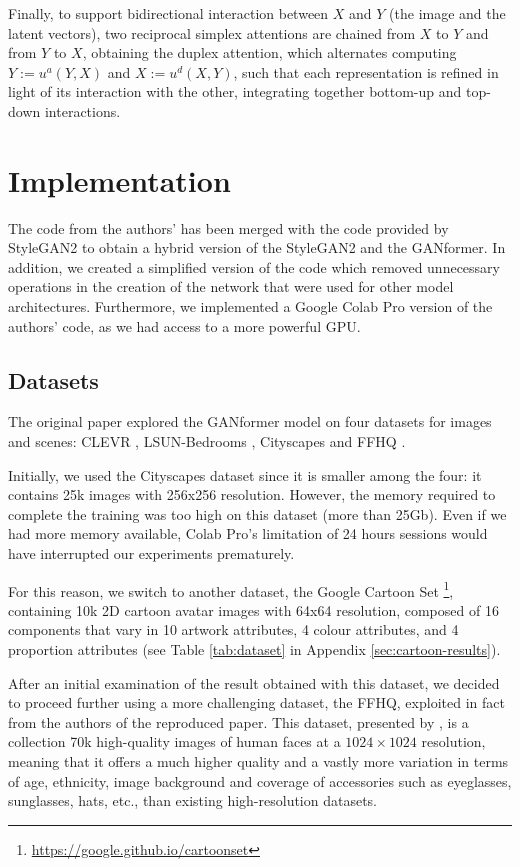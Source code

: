 \documentclass{article}
\begin{document}
Finally, to support bidirectional interaction between $X$ and $Y$ (the image and the latent vectors), 
two 
reciprocal simplex attentions are chained from $X$ to $Y$ and from $Y$ to $X$, obtaining the 
duplex 
attention, which alternates computing $Y :=u^a(Y,X)$ and $X:=u^d(X,Y)$, such that each 
representation is refined in light of its interaction with the other, integrating together bottom-up and 
top-down interactions.

\section{Implementation}
The code from the authors' has been merged with the code provided by StyleGAN2 to obtain a 
hybrid version of the StyleGAN2 and the GANformer. In addition, we created a simplified version of the code which removed unnecessary operations in the creation of the network that were used for other model architectures. Furthermore, we implemented a Google Colab Pro version of the authors’ code, as we had access to a more powerful GPU.

\subsection{Datasets}	\label{sec:dataset}
The original paper \cite{hudson2021generative} explored the GANformer model on four datasets for 
images and scenes: CLEVR \cite{johnson2017clevr}, LSUN-Bedrooms \cite{yu2015lsun}, Cityscapes 
\cite{cordts2016cityscapes} and FFHQ \cite{karras2019style}. 

Initially, we used the Cityscapes dataset since it is smaller among the four: it contains 
25k images with 256x256 resolution. 
However, the memory required to complete the training was too high on this dataset (more than 
25Gb).
Even if we had more memory available, Colab Pro's limitation of 24 hours sessions would have 
interrupted our experiments prematurely.

For this reason, we switch to another dataset, the Google Cartoon Set \cite{cartoonset}\footnote{	
	\url{https://google.github.io/cartoonset}}, containing 10k 2D cartoon avatar 
images with 64x64 resolution, composed of 16 components that vary in 10 artwork attributes, 4 
colour attributes, and 4 proportion attributes (see Table \ref{tab:dataset} in Appendix 
\ref{sec:cartoon-results}). 

After an initial examination of the result obtained with this dataset, we decided to proceed further using a more challenging dataset, the FFHQ, exploited in fact from the authors of the reproduced paper. 
This dataset, presented by \citet{karras2019style}, is a collection 70k high-quality images of human faces at a $1024×1024$ resolution, meaning that it offers a much higher quality and a vastly more variation in terms of age, ethnicity, image background and coverage of accessories such as eyeglasses, sunglasses, hats, etc., than existing high-resolution datasets.
\end{document}
